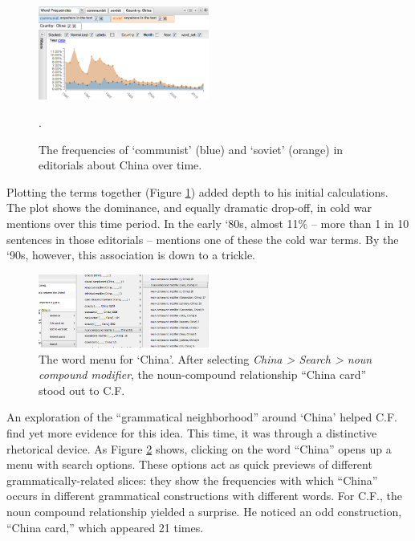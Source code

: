 \documentclass{sig-alternate}
\begin{document}
\begin{enumerate}
\begin{figure}[h!]
\includegraphics[width=0.5\textwidth]{fig/chris/04b.png}
\caption{The frequencies of `communist' (blue) and `soviet' (orange) in editorials about China over time. \label{fig:chris04b}}.
\end{figure}

Plotting the terms together (Figure \ref{fig:chris04b}) added depth to his initial calculations.  The plot shows the dominance, and equally dramatic drop-off, in cold war mentions over this time period. In the early `80s, almost 11\% -- more than 1 in 10 sentences in those editorials -- mentions one of these the cold war terms. By the `90s, however, this association is down to a trickle. 

\begin{figure}[h!]
\includegraphics[width=0.5\textwidth]{fig/chris/01.png}
\caption{The word menu for `China'.   After selecting \emph{China > Search > noun compound modifier}, the noun-compound relationship ``China card'' stood out to C.F. \label{fig:chris01}}
\end{figure}

An exploration of the ``grammatical neighborhood'' around `China'  helped C.F. find yet more evidence for this idea. This time, it was through a distinctive rhetorical device. As Figure \ref{fig:chris01} shows, clicking on the word ``China'' opens up a menu with search options. These options act as quick previews of different grammatically-related slices: they show the frequencies with which ``China'' occurs in different grammatical constructions with different words.  For C.F., the noun compound relationship yielded a surprise. He noticed an odd construction, ``China card,'' which appeared 21 times.


\end{enumerate}
\end{document}
